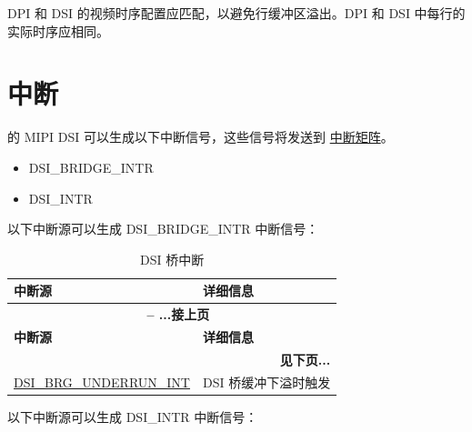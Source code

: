 \documentclass[main\_\_CN.tex]{subfiles}
\begin{document}
DPI 和 DSI 的视频时序配置应匹配，以避免行缓冲区溢出。DPI 和 DSI 中每行的实际时序应相同。


\section{中断}
\chipname{} 的 MIPI DSI 可以生成以下中断信号，这些信号将发送到 \hyperref[mod:intmtrx]{中断矩阵}。

\begin{itemize}
    \item DSI\_BRIDGE\_INTR
    \item DSI\_INTR
\end{itemize}

以下中断源可以生成 DSI\_BRIDGE\_INTR 中断信号：

\begin{longtable}[c]{ |p{5cm}|p{10cm}| }
    \caption{DSI 桥中断}
    \label{tab:dsi-bridge-intr}\\\hline

    \rowcolor{lightgray}
    \textbf{中断源} & \textbf{详细信息} \\\hline
    \endfirsthead


    \multicolumn{2}{c}{\bfseries \tablename\ \thetable{} -- ...接上页}\\\hline
    \rowcolor{lightgray}
    \textbf{中断源} & \textbf{详细信息} \\\hline
    \endhead

    \multicolumn{2}{r}{\textbf{见下页...}} \\
    \endfoot

    \endlastfoot

    \hyperref[fielddesc:DSIBRGUNDERRUNINTRAW]{DSI\_BRG\_UNDERRUN\_INT} &  DSI 桥缓冲下溢时触发 \\\hline
        

\end{longtable}

以下中断源可以生成 DSI\_INTR 中断信号：
\end{document}

